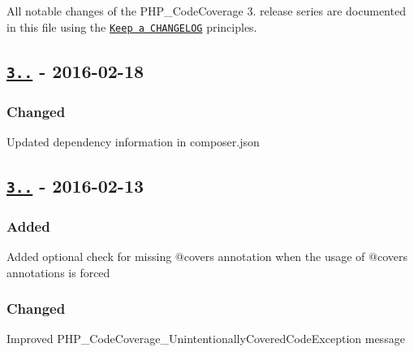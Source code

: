 All notable changes of the P\+H\+P\+\_\+\+Code\+Coverage 3. release series are documented in this file using the \href{http://keepachangelog.com/}{\tt Keep a C\+H\+A\+N\+G\+E\+L\+OG} principles.

\subsection*{\href{https://github.com/sebastianbergmann/php-code-coverage/compare/3.2.0...3.2.1}{\tt 3..} -\/ 2016-\/02-\/18}

\subsubsection*{Changed}


\begin{DoxyItemize}
\item Updated dependency information in {\ttfamily composer.\+json}
\end{DoxyItemize}

\subsection*{\href{https://github.com/sebastianbergmann/php-code-coverage/compare/3.1...3.2.0}{\tt 3..} -\/ 2016-\/02-\/13}

\subsubsection*{Added}


\begin{DoxyItemize}
\item Added optional check for missing {\ttfamily @covers} annotation when the usage of {\ttfamily @covers} annotations is forced
\end{DoxyItemize}

\subsubsection*{Changed}


\begin{DoxyItemize}
\item Improved {\ttfamily P\+H\+P\+\_\+\+Code\+Coverage\+\_\+\+Unintentionally\+Covered\+Code\+Exception} message 
\end{DoxyItemize}